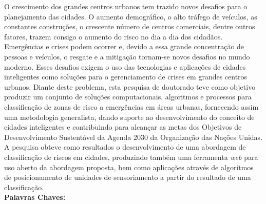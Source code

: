 \begin{thesisresumo}

O crescimento dos grandes centros urbanos tem trazido novos desafios para o planejamento das cidades. O aumento demográfico, o alto tráfego de veículos, as constantes construções, o crescente número de centros comerciais, dentre outros fatores, trazem consigo o aumento do risco no dia a dia dos cidadãos. Emergências e crises podem ocorrer e, devido a essa grande concentração de pessoas e veículos, o resgate e a mitigação tornam-se novos desafios no mundo moderno. Esses desafios exigem o uso das tecnologias e aplicações de cidades inteligentes como soluções para o gerenciamento de crises em grandes centros urbanos. Diante deste problema, esta pesquisa de doutorado teve como objetivo produzir um conjunto de soluções computacionais, algoritmos e processos para classificação de zonas de risco a emergências em áreas urbanas, fornecendo assim uma metodologia generalista, dando suporte ao desenvolvimento do conceito de cidades inteligentes e contribuindo para alcançar as metas dos Objetivos de Desenvolvimento Sustentável da Agenda 2030 da Organização das Nações Unidas. A pesquisa obteve como resultados o desenvolvimento de uma abordagem de classificação de riscos em cidades, produzindo também uma ferramenta \textit{web} para uso aberto da abordagem proposta, bem como aplicações através de algoritmos de posicionamento de unidades de sensoriamento a partir do resultado de uma classificação.\\

\textbf{Palavras Chaves:} \ppgmpalavraschave

\end{thesisresumo}

